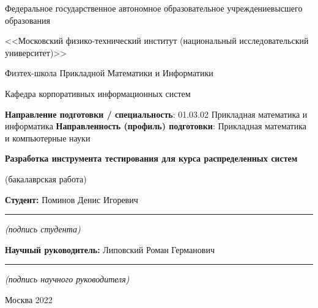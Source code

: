 \documentclass[14pt]{extarticle}
\renewcommand*{\maketitle}{
\begin{titlepage}
  \begin{center}
    \linespread{1}
    \small
    Федеральное государственное автономное образовательное учреждение\break высшего образования\par
    <<Московский физико-технический институт \break (национальный исследовательский университет)>>\par
    Физтех-школа Прикладной Математики и Информатики\par
    Кафедра корпоративных информационных систем\par
  \end{center}
%
  {
    \footnotesize
    {\bf Направление подготовки / специальность}: 01.03.02 Прикладная математика и информатика\newline
    {\bf Направленность (профиль) подготовки}: Прикладная математика и компьютерные науки
  }
%
  {
    \topskip0pt
    \vspace*{\fill}
    \begin{center}
      {\bf\Large Разработка инструмента тестирования
      \break для курса распределенных систем}\par
      (бакалаврская работа)
    \end{center}
    \vspace*{\fill}
  }
%
  \hfill
  \begin{minipage}[t]{8cm}
    {\bf Студент: \newline}
    Поминов Денис Игоревич\newline
    \vspace{-3mm}
    \rule{8cm}{0.15mm}
    \centerline{\scriptsize\it (подпись студента)}\newline
%
    {\bf Научный руководитель: \newline}
    Липовский Роман Германович\newline
    \vspace{-3mm}
    \rule{8cm}{0.15mm}
    \centerline{\scriptsize\it (подпись научного руководителя)}
  \end{minipage}

    \vspace*{\fill}
    \begin{center}
      Москва 2022
    \end{center}
\end{titlepage}
}
\begin{document}
\maketitle

\newpage
\setcounter{page}{2}

\vspace*{\fill}
\begin{abstract}
Тестирование распределенных алгоритмов – важная, но при этом нетривиальная задача из-за  недетерминизма как сети, так и отдельных узлов. Существующие подходы к  тестированию – fault-injection и model checking – по своему несовершенны: либо не покрывают все возможные сценарии исполнения, либо применяются к спецификации алгоритмов, а не тестируют непосредственно реализацию.

Цель данной работы – разработка инструмента для тестирования реализации распределенных алгоритмов, интегрированного в фреймворк курса по распределенным системам. Инструмент должен совмещать сильные стороны существующих подходов: как fault-injection, позволять тестировать непосредственно высокоуровневую реализацию на С++, при этом проверять все возможные состояния исполнения, как model checking.

В работе описана реализация такого инструмента и продемонстрировано его применение на содержательном примере – реализации лианеаризуемого реплицированного атомарного key value хранилища на основе алгоритма ABD.
\end{abstract}
\vspace*{\fill}

\newpage
\tableofcontents
\newpage







\newpage
\printbibliography
\end{document}
